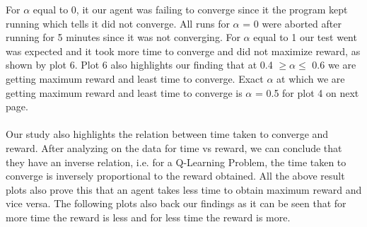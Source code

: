 \documentclass[conference]{IEEEtran}
\begin{document}
\newline

For $\alpha$ equal to 0, it our agent was failing to converge since it the program kept running which tells it did not converge. All runs for $\alpha$ = 0 were aborted after running for 5 minutes since it was not converging. For $\alpha$ equal to 1 our test went was expected and it took more time to converge and did not maximize reward, as shown by plot 6. Plot 6 also highlights our finding that at 0.4 $ \geq \alpha \leq$ 0.6 we are getting maximum reward and least time to converge. Exact $\alpha$ at which we are getting maximum reward and least time to converge is $\alpha$ = 0.5 for plot 4 on next page. \\ \\ Our study also highlights the relation between time taken to converge and reward. After analyzing on the data for time vs reward, we can conclude that they have an inverse relation, i.e. for a Q-Learning Problem, the time taken to converge is inversely proportional to the reward obtained. All the above result plots also prove this that an agent takes less time to obtain maximum reward and vice versa. The following plots also back our findings as it can be seen that for more time the reward is less and for less time the reward is more. 
\end{document}

